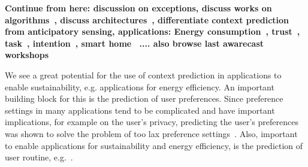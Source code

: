 \textbf{Continue from here: discussion on exceptions, discuss works on algorithms~\cite{4026,ContextPrediction_Feki_2007,6013,2097}, discuss architectures~\cite{4011,5001,5010}, differentiate context prediction from anticipatory sensing, applications: Energy consumption~\cite{ContextAwareness_Gordon_2011}, trust~\cite{2040}, task~\cite{5019}, intention~\cite{5830}, smart home~\cite{5163} .... also browse last awarecast workshops}

We see a great potential for the use of context prediction in applications to enable sustainability, e.g. applications for energy efficiency. 
An important building block for this is the prediction of user preferences. 
Since preference settings in many applications tend to be complicated and have important implications, for example on the user's privacy, predicting the user's preferences was shown to solve the problem of too lax preference settings~\cite{Prediction_Bigwood_2012}. 
Also, important to enable applications for sustainability and energy efficiency, is the prediction of user routine, e.g.~\cite{Prediction_Seiter_2012}.    

